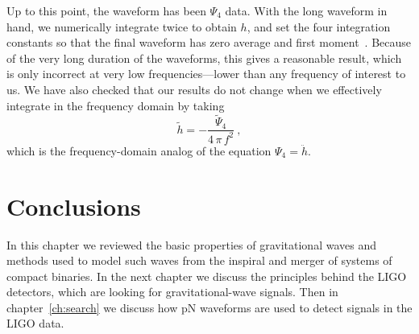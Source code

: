 Up to this point, the waveform has been $\Psi_{4}$ data.  With the
long waveform in hand, we numerically integrate twice to obtain $h$,
and set the four integration constants so that the final waveform has
zero average and first moment~\cite{Pfeiffer-Brown-etal:2007}.
Because of the very long duration of the waveforms, this gives a
reasonable result, which is only incorrect at very low
frequencies---lower than any frequency of interest to us.  We have
also checked that our results do not change when we effectively
integrate in the frequency domain by taking
\begin{equation}
  \label{eq:PsiFourIntegration}
  \tilde{h} = -\frac{\tilde{\Psi}_{4}}{4\,\pi\, f^{2}}\ ,
\end{equation}
which is the frequency-domain analog of the equation $\Psi_{4} =
\ddot{h}$.
\fi


\section{Conclusions}

In this chapter we reviewed the basic properties of gravitational
waves and methods used to model such waves from the inspiral and
merger of systems of compact binaries.  In the next chapter we discuss
the principles behind the LIGO detectors, which are looking for
gravitational-wave signals.  Then in chapter~\ref{ch:search} we
discuss how pN waveforms are used to detect signals in the LIGO data.



